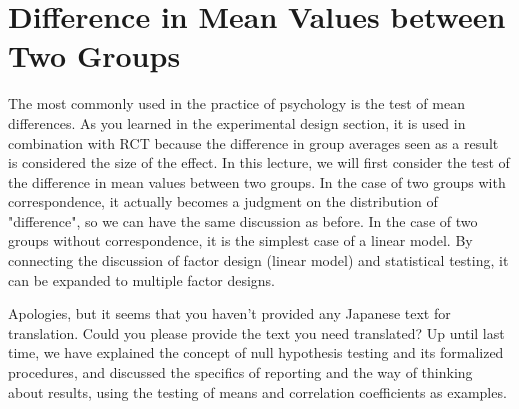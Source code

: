 \documentclass{ltjsbook}
\begin{document}
\chapter{Difference in Mean Values between Two Groups}
\label{m20_ttest}

The most commonly used in the practice of psychology is the test of mean differences. As you learned in the experimental design section, it is used in combination with RCT because the difference in group averages seen as a result is considered the size of the effect.
In this lecture, we will first consider the test of the difference in mean values between two groups. In the case of two groups with correspondence, it actually becomes a judgment on the distribution of "difference", so we can have the same discussion as before.
In the case of two groups without correspondence, it is the simplest case of a linear model. By connecting the discussion of factor design (linear model) and statistical testing, it can be expanded to multiple factor designs.

Apologies, but it seems that you haven't provided any Japanese text for translation. Could you please provide the text you need translated?
Up until last time, we have explained the concept of null hypothesis testing and its formalized procedures, and discussed the specifics of reporting and the way of thinking about results, using the testing of means and correlation coefficients as examples.
\end{document}
